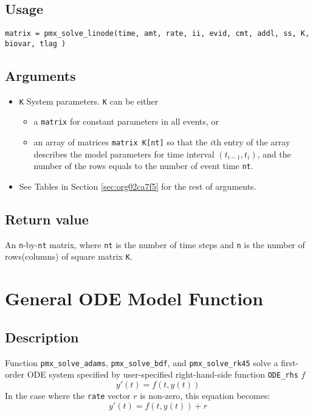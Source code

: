 \documentclass[12pt, reqno, oneside]{amsbook}
\numberwithin{equation}{chapter}
\numberwithin{figure}{chapter}
\numberwithin{table}{chapter}
\theoremstyle{remark}
\begin{document}
\subsection{Usage}
\label{sec:org24d89d8}
\begin{verbatim}
matrix = pmx_solve_linode(time, amt, rate, ii, evid, cmt, addl, ss, K, biovar, tlag )
\end{verbatim}

\subsection{Arguments}
\label{sec:org14ee903}
\begin{itemize}
\item \texttt{K}
System parameters. \texttt{K} can be either
\begin{itemize}
\item a \texttt{matrix} for constant parameters in all events, or
\item an array of matrices \texttt{matrix K[nt]} so that the \(i\)th entry of the array describes
the model parameters for time interval \((t_{i-1}, t_i)\),
and the number of the rows equals to the number of event time \texttt{nt}.
\end{itemize}
\item See Tables in Section \ref{sec:org02ca7f5} for the rest of arguments.
\end{itemize}
\subsection{Return value}
\label{sec:org5ab943c}
An \texttt{n}-by-\texttt{nt} matrix, where \texttt{nt} is the number of time steps and \texttt{n} is the number of rows(columns) of square matrix \texttt{K}.

\section{General ODE Model Function}
\label{sec:org337e56e}
\subsection{Description}
\label{sec:org63616ec}
Function \texttt{pmx\_solve\_adams}, \texttt{pmx\_solve\_bdf}, and \texttt{pmx\_solve\_rk45} solve a first-order ODE system
specified by user-specified right-hand-side function \texttt{ODE\_rhs} \(f\)
\begin{equation*}
y'(t) = f(t, y(t))
\end{equation*}
In the case where the \texttt{rate} vector \(r\) is non-zero, this equation becomes:
\begin{equation*}
y'(t) = f(t, y(t)) + r
\end{equation*}
\end{document}
